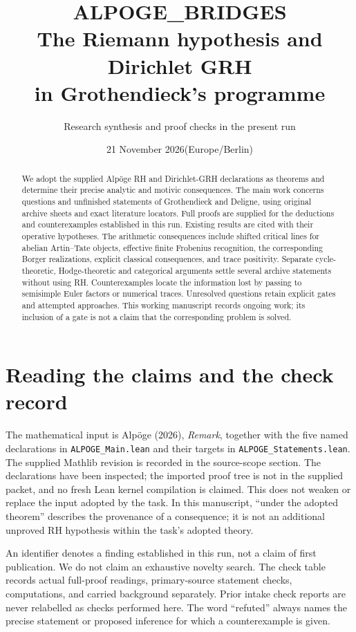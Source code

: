 \documentclass[11pt,a4paper]{article}
\title{ALPOGE\_BRIDGES\\The Riemann hypothesis and Dirichlet GRH\\in Grothendieck's programme}
\author{Research synthesis and proof checks in the present run}
\date{21 November 2026\quad\textnormal{(Europe/Berlin)}}
\theoremstyle{definition}\newtheorem{definition}[theorem]{Definition}
\theoremstyle{remark}\newtheorem{remark}[theorem]{Remark}
\begin{document}
\maketitle
\begin{abstract}
We adopt the supplied Alp\"oge RH and Dirichlet-GRH declarations as
theorems and determine their precise analytic and motivic consequences.
The main work concerns questions and unfinished statements of Grothendieck
and Deligne, using original archive sheets and exact literature locators.
Full proofs are supplied for the deductions and counterexamples established
in this run. Existing results are cited with their operative hypotheses.
The arithmetic consequences include shifted critical lines for abelian
Artin--Tate objects, effective finite Frobenius recognition, the corresponding
Borger realizations, explicit classical consequences, and trace positivity.
Separate cycle-theoretic, Hodge-theoretic and categorical arguments settle
several archive statements without using RH. Counterexamples locate the
information lost by passing to semisimple Euler factors or numerical traces.
Unresolved questions retain explicit gates and attempted approaches.
This working manuscript records ongoing work; its inclusion of a gate
is not a claim that the corresponding problem is solved.
\end{abstract}

\section*{Reading the claims and the check record}
The mathematical input is Alp\"oge (2026), \emph{Remark}, together with
the five named declarations in \texttt{ALPOGE\_Main.lean} and their
targets in \texttt{ALPOGE\_Statements.lean}. The supplied Mathlib revision
is recorded in the source-scope section. The declarations have been
inspected; the imported proof tree is not in the supplied packet, and
no fresh Lean kernel compilation is claimed. This does not weaken or
replace the input adopted by the task. In this manuscript, ``under the
adopted theorem'' describes the provenance of a consequence; it is not
an additional unproved RH hypothesis within the task's adopted theory.

An identifier denotes a finding established in this run, not a claim
of first publication. We do not claim an exhaustive novelty search.
The check table records actual full-proof readings, primary-source
statement checks, computations, and carried background separately.
Prior intake check reports are never relabelled as checks performed
here. The word ``refuted'' always names the precise statement or
proposed inference for which a counterexample is given.
\end{document}
